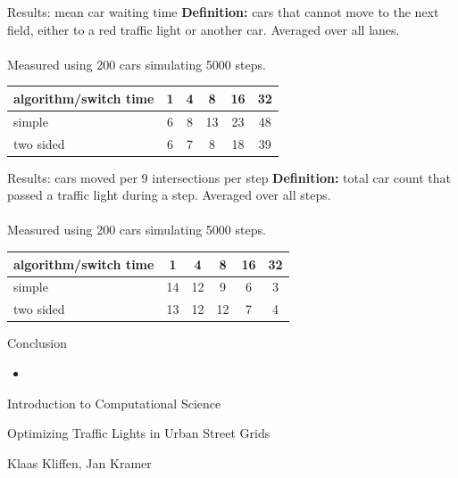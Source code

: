 \documentclass[11pt]{beamer}
\begin{document}
\begin{frame}{Results: mean car waiting time}
\textbf{Definition:} cars that cannot move to the next field, either to a 
red traffic light or another car. Averaged over all lanes.\\~\\
Measured using 200 cars simulating 5000 steps.

\begin{table}
\centering
\begin{tabular}{l|c|c|c|c|c}
algorithm/switch time & 1 & 4 & 8 & 16 & 32\\
\hline
simple & 6 & 8 & 13 & 23 & 48\\
two sided & 6 & 7 & 8 & 18 & 39\\
\end{tabular}
\end{table}
 
\end{frame}

\begin{frame}{Results: cars moved per 9 intersections per step}
\textbf{Definition:} total car count that passed a traffic light during a step.
Averaged over all steps.\\~\\
Measured using 200 cars simulating 5000 steps.
\begin{table}
\centering
\begin{tabular}{l|c|c|c|c|c}
algorithm/switch time & 1 & 4 & 8 & 16 & 32\\
\hline
simple & 14 & 12 & 9 & 6 & 3\\
two sided & 13 & 12 & 12 & 7 & 4\\
\end{tabular}
\end{table}
 
\end{frame}


\begin{frame}{Conclusion}

\begin{itemize}
 \item 
\end{itemize}

    
\end{frame}

\begin{frame}{Introduction to Computational Science}
\begin{center}
{\large Optimizing Traffic Lights in Urban Street Grids}\\
\end{center}

\begin{center}
Klaas Kliffen, Jan Kramer
\end{center}

    
\end{frame}
\end{document}
